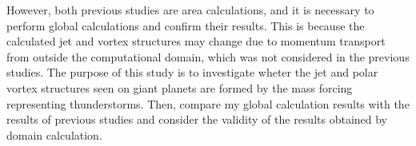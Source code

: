 \documentclass[a4j,12pt,openbib,oneside]{jreport}
\begin{document}
However, both previous studies are area calculations, 
and it is necessary to perform global calculations and confirm their results.
%
This is because the calculated jet and vortex structures 
may change due to momentum transport from outside the computational domain, 
which was not considered in the previous studies.
%
The purpose of this study is to investigate
wheter the jet and polar vortex structures seen on giant planets are
formed by the mass forcing representing thunderstorms.
%
Then, compare my global calculation results with the results of previous studies 
and consider the validity of the results obtained by domain calculation.
\end{document}
